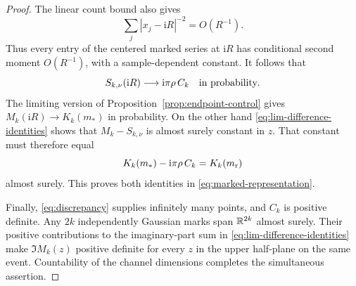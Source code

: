 \begin{proof}
The linear count bound also gives
\[
 \sum_j|x_j-\mathrm i R|^{-2}=O(R^{-1}).
\]
Thus every entry of the centered marked series at
\(\mathrm i R\) has conditional second moment \(O(R^{-1})\),
with a sample-dependent constant. It follows that
\[
 S_{k,\nu}(\mathrm i R)
 \longrightarrow \mathrm i\pi\rho\,C_k
 \quad\hbox{in probability}.
\]
The limiting version of Proposition~\ref{prop:endpoint-control}
gives \(M_k(\mathrm i R)\to K_k(m_*)\) in probability. On the
other hand \eqref{eq:lim-difference-identities} shows that
\(M_k-S_{k,\nu}\) is almost surely constant in \(z\).
That constant must therefore equal
\[
 K_k(m_*)-\mathrm i\pi\rho\,C_k=K_k(m_{\rm r})
\]
almost surely. This proves both identities in
\eqref{eq:marked-representation}.

Finally, \eqref{eq:discrepancy} supplies infinitely many points,
and \(C_k\) is positive definite. Any \(2k\) independently
Gaussian marks span \(\mathbb R^{2k}\) almost surely. Their positive
contributions to the imaginary-part sum in
\eqref{eq:lim-difference-identities} make \(\Im M_k(z)\) positive
definite for every \(z\) in the upper half-plane on the same
event. Countability of the channel dimensions completes the
simultaneous assertion.
\end{proof}
